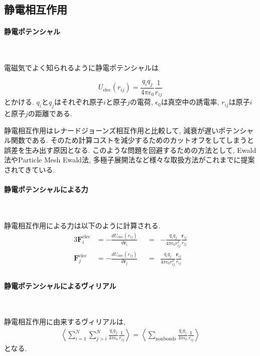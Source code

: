 \clearpage

\subsection{静電相互作用}
\paragraph{静電ポテンシャル} \

電磁気でよく知られるように静電ポテンシャルは

\begin{equation}
U_{\mathrm{elec}}(r_{ij}) = \frac{q_{i}q_{j}}{4 \pi \epsilon_{0}}
                            \frac{1}{r_{ij}}
\end{equation}
とかける.
$q_{i}$と$q_{j}$はそれぞれ原子$i$と原子$j$の電荷, $\epsilon_{0}$は真空中の誘電率, 
$r_{ij}$は原子$i$と原子$j$の距離である.

静電相互作用はレナードジョーンズ相互作用と比較して, 減衰が遅いポテンシャル関数である.
そのため計算コストを減少するためのカットオフをしてしまうと誤差を生み出す原因となる.
このような問題を回避するための方法として, Ewald法やParticle Mesh Ewald法,
多極子展開法など様々な取扱方法がこれまでに提案されてきている\cite{2014Cisneros}.

\paragraph{静電ポテンシャルによる力} \

静電相互作用による力は以下のように計算される.
\begin{alignat}{3}
   \bm{F}_{i}^{\mathrm{elec}}
 &=
   -\frac{d U_{\mathrm{elec}}(r_{ij})}{d \bm{r}_{i}}
&&=&
   -\frac{q_{i}q_{j}}{4 \pi \epsilon_{0} r_{ij}^{2}}
    \frac{\bm{r}_{ij}}{r_{ij}}
 \\
    \bm{F}_{j}^{\mathrm{elec}}
 &=
   -\frac{d U_{\mathrm{elec}}(r_{ij})}{d \bm{r}_{j}}
&&=&
    \frac{q_{i}q_{j}}{4 \pi \epsilon_{0} r_{ij}^{2}}
    \frac{\bm{r}_{ij}}{r_{ij}}
 \\
\end{alignat}

\paragraph{静電ポテンシャルによるヴィリアル} \

静電相互作用に由来するヴィリアルは,
\begin{align}
  \left\langle
  \sum_{i=1}^{N} \sum_{j > i}^{N}
  \frac{q_{i}q_{j}}{4 \pi \epsilon_{0}}
  \frac{1}{r_{ij}}
  \right\rangle
 =
  \left\langle
  \sum_{\mathrm{nonbonds}}
  \frac{q_{i}q_{j}}{4 \pi \epsilon_{0}}
  \frac{1}{r_{ij}}
  \right\rangle
\end{align}
となる.

